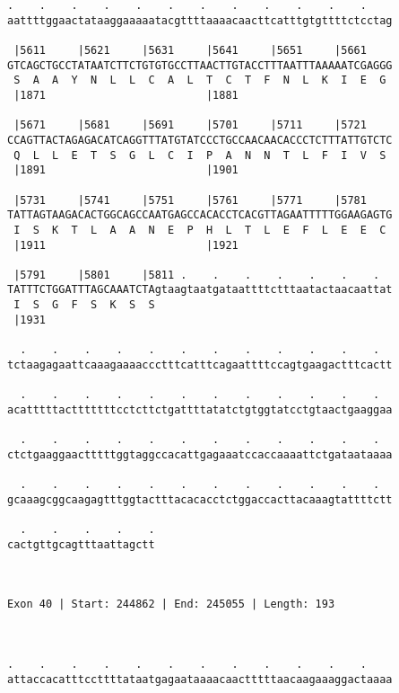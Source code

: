 \documentclass{article}
\begin{document}
\begin{Verbatim}
.    .    .    .    .    .    .    .    .    .    .    .    
aattttggaactataaggaaaaatacgttttaaaacaacttcatttgtgttttctcctag
                                                            
 |5611     |5621     |5631     |5641     |5651     |5661    
GTCAGCTGCCTATAATCTTCTGTGTGCCTTAACTTGTACCTTTAATTTAAAAATCGAGGG
 S  A  A  Y  N  L  L  C  A  L  T  C  T  F  N  L  K  I  E  G 
 |1871                         |1881                        
  
 |5671     |5681     |5691     |5701     |5711     |5721    
CCAGTTACTAGAGACATCAGGTTTATGTATCCCTGCCAACAACACCCTCTTTATTGTCTC
 Q  L  L  E  T  S  G  L  C  I  P  A  N  N  T  L  F  I  V  S 
 |1891                         |1901                        
  
 |5731     |5741     |5751     |5761     |5771     |5781    
TATTAGTAAGACACTGGCAGCCAATGAGCCACACCTCACGTTAGAATTTTTGGAAGAGTG
 I  S  K  T  L  A  A  N  E  P  H  L  T  L  E  F  L  E  E  C 
 |1911                         |1921                        
  
 |5791     |5801     |5811 .    .    .    .    .    .    .  
TATTTCTGGATTTAGCAAATCTAgtaagtaatgataattttctttaatactaacaattat
 I  S  G  F  S  K  S  S                                     
 |1931                                                      
  
  .    .    .    .    .    .    .    .    .    .    .    .  
tctaagagaattcaaagaaaaccctttcatttcagaattttccagtgaagactttcactt
                                                            
  .    .    .    .    .    .    .    .    .    .    .    .  
acatttttactttttttcctcttctgattttatatctgtggtatcctgtaactgaaggaa
                                                            
  .    .    .    .    .    .    .    .    .    .    .    .  
ctctgaaggaactttttggtaggccacattgagaaatccaccaaaattctgataataaaa
                                                            
  .    .    .    .    .    .    .    .    .    .    .    .  
gcaaagcggcaagagtttggtactttacacacctctggaccacttacaaagtattttctt
                                                            
  .    .    .    .    .
cactgttgcagtttaattagctt
                       
                       
 
Exon 40 | Start: 244862 | End: 245055 | Length: 193



.    .    .    .    .    .    .    .    .    .    .    .    
attaccacatttccttttataatgagaataaaacaactttttaacaagaaaggactaaaa
                                                            

\end{Verbatim}
\end{document}
